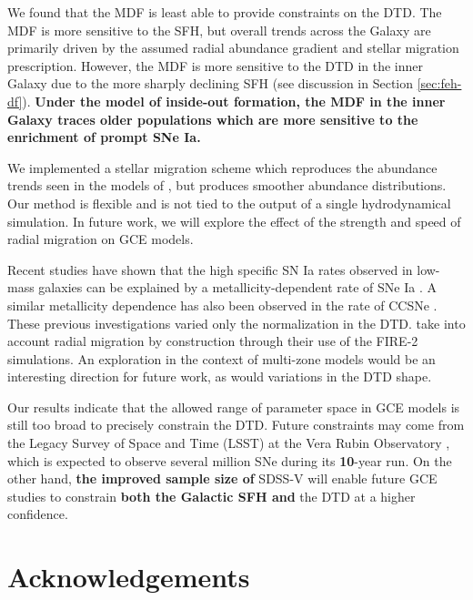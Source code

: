 \documentclass[twocolumn,twocolappendix,linenumbers]{aastex631}
\begin{document}
We found that the MDF is least able to provide constraints on the DTD. The MDF is more sensitive to the SFH, but overall trends across the Galaxy are primarily driven by the assumed radial abundance gradient and stellar migration prescription. However, the MDF is more sensitive to the DTD in the inner Galaxy due to the more sharply declining SFH (see discussion in Section \ref{sec:feh-df}). {\bf Under the model of inside-out formation, the MDF in the inner Galaxy traces older populations which are more sensitive to the enrichment of prompt SNe Ia.}

We implemented a stellar migration scheme which reproduces the abundance trends seen in the models of , but produces smoother abundance distributions. Our method is flexible and is not tied to the output of a single hydrodynamical simulation. In future work, we will explore the effect of the strength and speed of radial migration on GCE models.

Recent studies have shown that the high specific SN Ia rates observed in low-mass galaxies \citep[e.g.,][]{Brown2019-ASASSNrates,Wiseman2021-DESRates} can be explained by a metallicity-dependent rate of SNe Ia \citep{Gandhi2022-MetallicityDependentRates,Johnson2023-Binaries}. A similar metallicity dependence has also been observed in the rate of CCSNe \citep{Pessi2023-MetalDepCCSNe}. These previous investigations varied only the normalization in the DTD. \citet{Gandhi2022-MetallicityDependentRates} take into account radial migration by construction through their use of the FIRE-2 simulations. An exploration in the context of multi-zone models would be an interesting direction for future work, as would variations in the DTD shape.

Our results indicate that the allowed range of parameter space in GCE models is still too broad to precisely constrain the DTD. Future constraints may come from the Legacy Survey of Space and Time (LSST) at the Vera Rubin Observatory \citep{Ivezic2019-LSST}, which is expected to observe several million SNe during its {\bf 10}-year run. On the other hand, %
{\bf the improved sample size of} SDSS-V \citep{Kollmeier2017-SDSS-V} will enable future GCE studies to constrain {\bf both the Galactic SFH and} the DTD at a higher confidence.

\section*{Acknowledgements}
\end{document}
